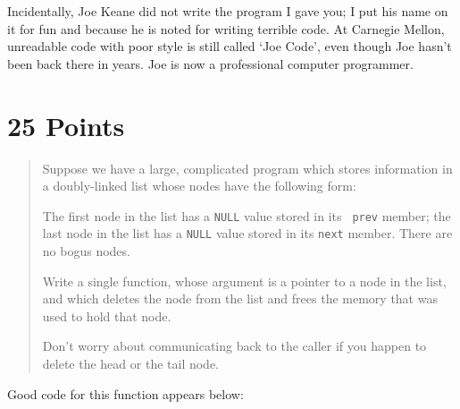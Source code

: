 Incidentally, Joe Keane did not write the program I gave you; I put his
name on it for fun and because he is noted for writing terrible code.
At Carnegie Mellon, unreadable code with poor style is still called `Joe
Code', even though Joe hasn't been back there in years.  Joe is now a
professional computer programmer.

\section{25 Points}

\begin{quotation}
\small
Suppose we have a large, complicated program which stores information in
a doubly-linked list whose nodes have the following form:

\begin{flushleft}
\verb% struct node {% \\*
\verb%   int province_code;% \\*
\verb%   int beheadment_count;% \\*
\verb%   int rioting_index;% \\*
\verb%   struct node *next; /* Pointer to next node in list */% \\*
\verb%   struct node *prev; /* Pointer to previous node in list */% \\*
\verb% } ;% 
\end{flushleft}
\label{struct}

The first node in the list has a {\tt NULL} value stored in its {\tt
prev} member; the last node in the list has a {\tt NULL} value stored in
its {\tt next} member.  There are no bogus nodes.

Write a single function, whose argument is a pointer to a node in the
list, and which deletes the node from the list and frees the memory that
was used to hold that node.

Don't worry about communicating back to the caller if you happen to
delete the head or the tail node.
\end{quotation}

Good code for this function appears below:

\begin{flushleft}
\verb% void delete_node(struct node *delete_me)% \\*
\verb% {% \\*
\verb%   if (delete_me->next)% \\*
\verb%     delete_me->next->prev = delete_me->prev;% \\*
\verb% % \\*
\verb%   if (delete_me->prev)% \\*
\verb%     delete_me->prev->next = delete_me->next;% \\*
\verb% % \\*
\verb%   free(delete_me);% \\*
\verb% }% 
\end{flushleft}

